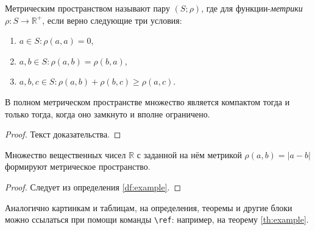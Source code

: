 \begin{Df}\label{df:example}
    Метрическим пространством называют пару $(S; \rho)$, где для функции-\textit{метрики} $\rho: S \to \mathbb R^+$, если верно следующие три условия:
    \begin{enumerate}
        \item $a \in S : \rho(a, a) = 0$,
        \item $a, b \in S : \rho(a, b) = \rho(b, a)$,
        \item $a, b, c \in S : \rho(a, b) + \rho(b, c) \ge \rho(a, c)$.
    \end{enumerate}
\end{Df}

\begin{Th}[Хаусдорф]\label{th:example}
    В полном метрическом пространстве множество является компактом тогда и только тогда, когда оно замкнуто и вполне ограничено.
\end{Th}
\begin{proof}
    Текст доказательства.
\end{proof}

\begin{Ex}
    Множество вещественных чисел $\mathbb R$ с заданной на нём метрикой $\rho(a, b) = |a - b|$ формируют метрическое пространство.
\end{Ex}
\begin{proof}
    Следует из определения \ref{df:example}.
\end{proof}

Аналогично картинкам и таблицам, на определения, теоремы и другие блоки можно ссылаться при помощи команды \verb|\ref|: например, на теорему \ref{th:example}.

